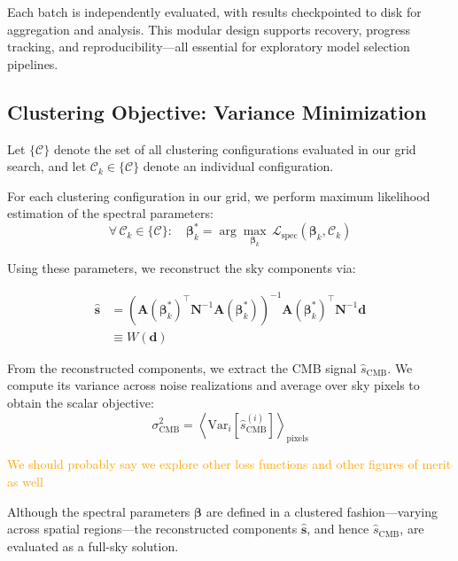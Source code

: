 \documentclass[fleqn,usenatbib]{mnras}
\newcommand{\je}[1]{\textcolor{orange}{#1}}
\begin{document}
Each batch is independently evaluated, with results checkpointed to disk for aggregation and analysis. This modular design supports recovery, progress tracking, and reproducibility—all essential for exploratory model selection pipelines.
\subsection{Clustering Objective: Variance Minimization}
\label{subsec:variance_minimization}

Let \(\{\mathcal{C}\}\) denote the set of all clustering configurations evaluated in our grid search, and let \(\mathcal{C}_k \in \{\mathcal{C}\}\) denote an individual configuration.

For each clustering configuration in our grid, we perform maximum likelihood estimation of the spectral parameters:
\begin{equation}
\label{eq:grid_search}
\forall\, \mathcal{C}_k \in \{\mathcal{C}\} : \quad \boldsymbol{\beta}_k^* = \arg \max_{\boldsymbol{\beta}_k} \, \mathcal{L}_{\mathrm{spec}}(\boldsymbol{\beta}_k, \mathcal{C}_k)
\end{equation}

Using these parameters, we reconstruct the sky components via:


\begin{align}
\hat{\mathbf{s}} &= \left( \mathbf{A}(\boldsymbol{\beta}_k^*)^\top \mathbf{N}^{-1} \mathbf{A}(\boldsymbol{\beta}_k^*) \right)^{-1} \mathbf{A}(\boldsymbol{\beta}_k^*)^\top \mathbf{N}^{-1} \mathbf{d} \label{eq:recon_operator} \\
                 &\equiv W(\mathbf{d})
\end{align}

From the reconstructed components, we extract the CMB signal \( \hat{s}_{\mathrm{CMB}} \). We compute its variance across noise realizations and average over sky pixels to obtain the scalar objective:
\begin{equation}
\label{eq:min_var}
    \sigma^2_{\mathrm{CMB}} = \left\langle \mathrm{Var}_{i} \left[ \hat{s}^{(i)}_{\mathrm{CMB}} \right] \right\rangle_{\text{pixels}}
\end{equation}

\je{We should probably say we explore other loss functions and other figures of merit as well}

Although the spectral parameters \( \boldsymbol{\beta} \) are defined in a clustered fashion—varying across spatial regions—the reconstructed components \( \hat{\mathbf{s}} \), and hence \( \hat{s}_{\mathrm{CMB}} \), are evaluated as a full-sky solution.
\end{document}
